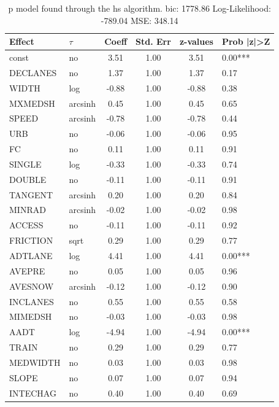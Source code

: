 \begin{table}
	\caption{p model found through the hs algorithm. bic: 1778.86 Log-Likelihood: -789.04 MSE: 348.14}
	\begin{center}
		\begin{tabular}{|l|l|c|c|c|l|}
			\hline
			Effect & $\tau$ & Coeff & Std. Err & z-values & Prob |z|>Z \\
			\hline
			const & no & 3.51 & 1.00 & 3.51 & 0.00*** \\
			\hline
			DECLANES & no & 1.37 & 1.00 & 1.37 & 0.17 \\
			\hline
			WIDTH & log & -0.88 & 1.00 & -0.88 & 0.38 \\
			\hline
			MXMEDSH & arcsinh & 0.45 & 1.00 & 0.45 & 0.65 \\
			\hline
			SPEED & arcsinh & -0.78 & 1.00 & -0.78 & 0.44 \\
			\hline
			URB & no & -0.06 & 1.00 & -0.06 & 0.95 \\
			\hline
			FC & no & 0.11 & 1.00 & 0.11 & 0.91 \\
			\hline
			SINGLE & log & -0.33 & 1.00 & -0.33 & 0.74 \\
			\hline
			DOUBLE & no & -0.11 & 1.00 & -0.11 & 0.91 \\
			\hline
			TANGENT & arcsinh & 0.20 & 1.00 & 0.20 & 0.84 \\
			\hline
			MINRAD & arcsinh & -0.02 & 1.00 & -0.02 & 0.98 \\
			\hline
			ACCESS & no & -0.11 & 1.00 & -0.11 & 0.92 \\
			\hline
			FRICTION & sqrt & 0.29 & 1.00 & 0.29 & 0.77 \\
			\hline
			ADTLANE & log & 4.41 & 1.00 & 4.41 & 0.00*** \\
			\hline
			AVEPRE & no & 0.05 & 1.00 & 0.05 & 0.96 \\
			\hline
			AVESNOW & arcsinh & -0.12 & 1.00 & -0.12 & 0.90 \\
			\hline
			INCLANES & no & 0.55 & 1.00 & 0.55 & 0.58 \\
			\hline
			MIMEDSH & no & -0.03 & 1.00 & -0.03 & 0.98 \\
			\hline
			AADT & log & -4.94 & 1.00 & -4.94 & 0.00*** \\
			\hline
			TRAIN & no & 0.29 & 1.00 & 0.29 & 0.77 \\
			\hline
			MEDWIDTH & no & 0.03 & 1.00 & 0.03 & 0.98 \\
			\hline
			SLOPE & no & 0.07 & 1.00 & 0.07 & 0.94 \\
			\hline
			INTECHAG & no & 0.40 & 1.00 & 0.40 & 0.69 \\

\end{tabular}
\end{center}
\end{table}
